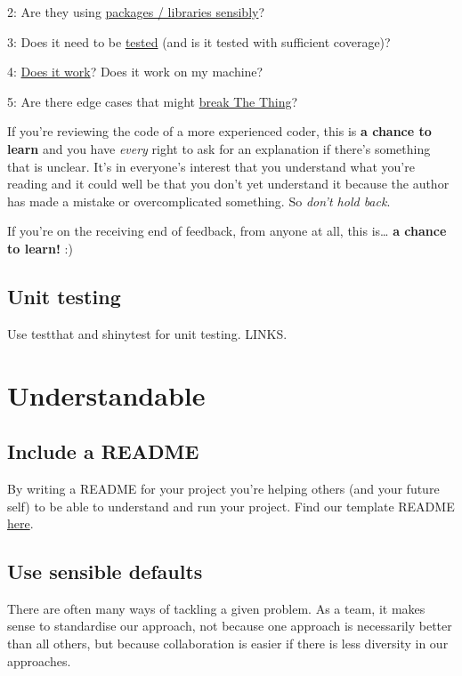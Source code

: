 \documentclass[]{book}
\begin{document}
2: Are they using \protect\hyperlink{defaults}{packages / libraries sensibly}?

3: Does it need to be \protect\hyperlink{ccc}{tested} (and is it tested with sufficient coverage)?

4: \protect\hyperlink{ccc}{Does it work}? Does it work on my machine?

5: Are there edge cases that might \protect\hyperlink{errors}{break The Thing}?

If you're reviewing the code of a more experienced coder, this is \textbf{a chance to learn} and you have \emph{every} right to ask for an explanation if there's something that is unclear. It's in everyone's interest that you understand what you're reading and it could well be that you don't yet understand it because the author has made a mistake or overcomplicated something. So \emph{don't hold back}.

If you're on the receiving end of feedback, from anyone at all, this is\ldots{} \textbf{a chance to learn!} :)

\hypertarget{unittest}{%
\subsection{Unit testing}\label{unittest}}

Use testthat and shinytest for unit testing.
LINKS.

\hypertarget{understand}{%
\section{Understandable}\label{understand}}

\hypertarget{readme}{%
\subsection{Include a README}\label{readme}}

By writing a README for your project you're helping others (and your future self) to be able to understand and run your project. Find our template README \href{https://github.com/moj-analytical-services/our-coding-standards/blob/master/README_template.md}{here}.

\hypertarget{defaults}{%
\subsection{Use sensible defaults}\label{defaults}}

There are often many ways of tackling a given problem. As a team, it makes sense to standardise our approach, not because one approach is necessarily better than all others, but because collaboration is easier if there is less diversity in our approaches.
\end{document}
